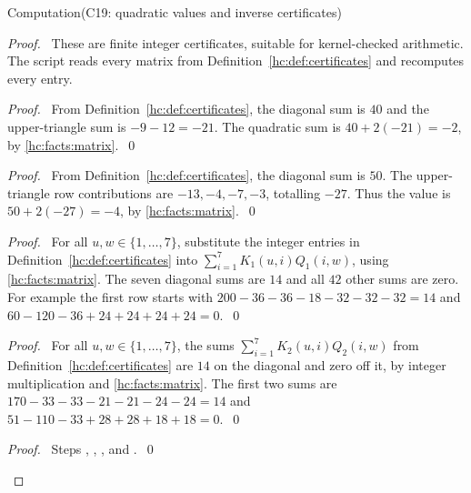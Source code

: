 \begin{mergedproofsection}
\begin{namedresult}{Computation}{(C19: quadratic values and inverse certificates)}\label{hc:comp:C19}
 \leavevmode\par
\end{namedresult}
\begin{proof}
 \pfsketch\ These are finite integer certificates, suitable for
 kernel-checked arithmetic. The script  reads every matrix
 from Definition~\ref{hc:def:certificates} and recomputes every entry.
 \begin{proof}\pf\ From Definition~\ref{hc:def:certificates}, the
  diagonal sum is $40$ and the upper-triangle sum is $-9-12=-21$.
  The quadratic sum is $40+2(-21)=-2$, by \ref{hc:facts:matrix}.~\qed\end{proof}
 \begin{proof}\pf\ From Definition~\ref{hc:def:certificates}, the
  diagonal sum is $50$. The upper-triangle row contributions are
  $-13,-4,-7,-3$, totalling $-27$. Thus the value is
  $50+2(-27)=-4$, by \ref{hc:facts:matrix}.~\qed\end{proof}
 \begin{proof}\pf\ For all $u,w\in\{1,\ldots,7\}$, substitute the
  integer entries in Definition~\ref{hc:def:certificates} into
  $\sum_{i=1}^7K_1(u,i)Q_1(i,w)$, using \ref{hc:facts:matrix}.
  The seven diagonal sums are $14$ and all $42$ other sums are zero.
  For example the first row starts with
  $200-36-36-18-32-32-32=14$ and
  $60-120-36+24+24+24+24=0$.~\qed\end{proof}
 \begin{proof}\pf\ For all $u,w\in\{1,\ldots,7\}$, the sums
  $\sum_{i=1}^7K_2(u,i)Q_2(i,w)$ from
  Definition~\ref{hc:def:certificates} are $14$ on the diagonal
  and zero off it, by integer multiplication and \ref{hc:facts:matrix}.
  The first two sums are
  $170-33-33-21-21-24-24=14$ and
  $51-110-33+28+28+18+18=0$.~\qed\end{proof}
 \qedstep
 \begin{proof}\pf\ Steps , ,
  , and .~\qed\end{proof}
\end{proof}


\end{mergedproofsection}
